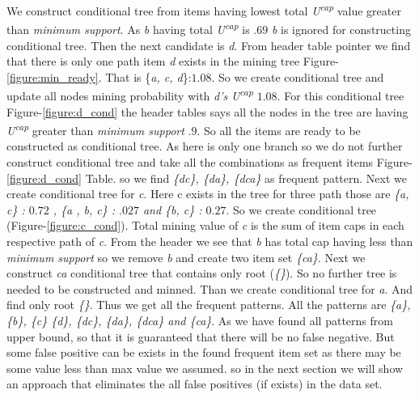     We construct conditional tree from items having lowest total \emph{U\textsuperscript{cap}} value greater than \emph{minimum support}. As \emph{b} having total \emph{U\textsuperscript{cap}} is $.69$ \emph{b} is ignored for constructing conditional tree. Then the next candidate is \emph{d}. From header table pointer we find that there is only one path item \emph{d} exists in the mining tree Figure-\ref{figure:min_ready}. That is \{\emph{a, c, d}\}:$1.08$. So we create conditional tree and update all nodes mining probability with \emph{d's} \emph{U\textsuperscript{cap}} $1.08$. For this conditional tree Figure-\ref{figure:d_cond} the header tables says all the nodes in the tree are having \emph{U\textsuperscript{cap}} greater than \emph{minimum support} $.9$. So all the items are ready to be constructed as conditional tree. As here is only one branch so we do not further construct conditional tree and take all the combinations as frequent items Figure-\ref{figure:d_cond} Table. so we find \emph{\{dc\}, \{da\}, \{dca\}} as frequent pattern. Next we create conditional tree for \emph{c}. Here c exists in the tree for three path those are \emph{\{a, c\} : $0.72$ , \{a , b, c\} : $.027$ and \{b, c\} : $0.27$}. So we create conditional tree (Figure-\ref{figure:c_cond}). Total mining value of \emph{c} is the sum of item caps in each respective path of \emph{c}. From the header we see that  \emph{b} has total cap having less than \emph{minimum support} so we remove \emph{b} and create two item set \emph{\{ca\}}. Next we construct \emph{ca} conditional tree that contains only root (\emph{\{\}}). So no further tree is needed to be constructed and minned. Than we create conditional tree for \emph{a}. And find only root \emph{\{\}}. Thus we get all the  frequent patterns. All the patterns are \emph{\{a\}, \{b\}, \{c\} \{d\}, \{dc\}, \{da\}, \{dca\} and \{ca\}}. As we have found all patterns from upper bound, so that it is guaranteed that there will be no false negative. But some false positive can be exists in the found frequent item set as there may be some value less than max value we assumed. so in the next section we will show an approach that eliminates the all false positives (if exists) in the data set.
    
    
